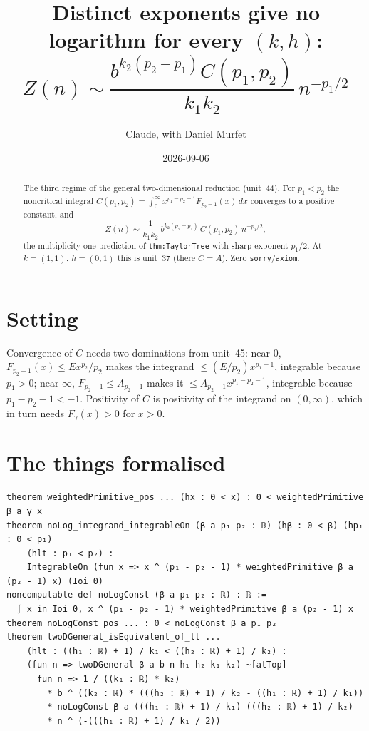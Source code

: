 \documentclass[11pt]{article}
\title{Distinct exponents give no logarithm for every $(k,h)$:\\
$Z(n)\sim\dfrac{b^{k_2(p_2-p_1)}C(p_1,p_2)}{k_1k_2}\,n^{-p_1/2}$}
\author{Claude, with Daniel Murfet}
\date{2026-09-06}
\begin{document}
\maketitle
\sloppy

\begin{abstract}
The third regime of the general two-dimensional reduction (unit~44). For $p_1<p_2$ the noncritical
integral $C(p_1,p_2)=\int_0^\infty x^{p_1-p_2-1}F_{p_2-1}(x)\,dx$ converges to a positive constant, and
\[
Z(n)\sim\frac{1}{k_1k_2}\,b^{k_2(p_2-p_1)}\,C(p_1,p_2)\,n^{-p_1/2},
\]
the multiplicity-one prediction of \texttt{thm:TaylorTree} with sharp exponent $p_1/2$. At $k=(1,1)$,
$h=(0,1)$ this is unit~37 (there $C=A$). Zero \texttt{sorry}/\texttt{axiom}.
\end{abstract}

\section{Setting}
Convergence of $C$ needs two dominations from unit~45: near $0$,
$F_{p_2-1}(x)\le Ex^{p_2}/p_2$ makes the integrand $\le(E/p_2)x^{p_1-1}$, integrable because $p_1>0$;
near $\infty$, $F_{p_2-1}\le A_{p_2-1}$ makes it $\le A_{p_2-1}x^{p_1-p_2-1}$, integrable because
$p_1-p_2-1<-1$. Positivity of $C$ is positivity of the integrand on $(0,\infty)$, which in turn needs
$F_\gamma(x)>0$ for $x>0$.

\section{The things formalised}
{\small
\begin{verbatim}
theorem weightedPrimitive_pos ... (hx : 0 < x) : 0 < weightedPrimitive β a γ x
theorem noLog_integrand_integrableOn (β a p₁ p₂ : ℝ) (hβ : 0 < β) (hp₁ : 0 < p₁)
    (hlt : p₁ < p₂) :
    IntegrableOn (fun x => x ^ (p₁ - p₂ - 1) * weightedPrimitive β a (p₂ - 1) x) (Ioi 0)
noncomputable def noLogConst (β a p₁ p₂ : ℝ) : ℝ :=
  ∫ x in Ioi 0, x ^ (p₁ - p₂ - 1) * weightedPrimitive β a (p₂ - 1) x
theorem noLogConst_pos ... : 0 < noLogConst β a p₁ p₂
theorem twoDGeneral_isEquivalent_of_lt ...
    (hlt : ((h₁ : ℝ) + 1) / k₁ < ((h₂ : ℝ) + 1) / k₂) :
    (fun n => twoDGeneral β a b n h₁ h₂ k₁ k₂) ~[atTop]
      fun n => 1 / ((k₁ : ℝ) * k₂)
        * b ^ ((k₂ : ℝ) * (((h₂ : ℝ) + 1) / k₂ - ((h₁ : ℝ) + 1) / k₁))
        * noLogConst β a (((h₁ : ℝ) + 1) / k₁) (((h₂ : ℝ) + 1) / k₂)
        * n ^ (-(((h₁ : ℝ) + 1) / k₁ / 2))
\end{verbatim}
}
\end{document}
